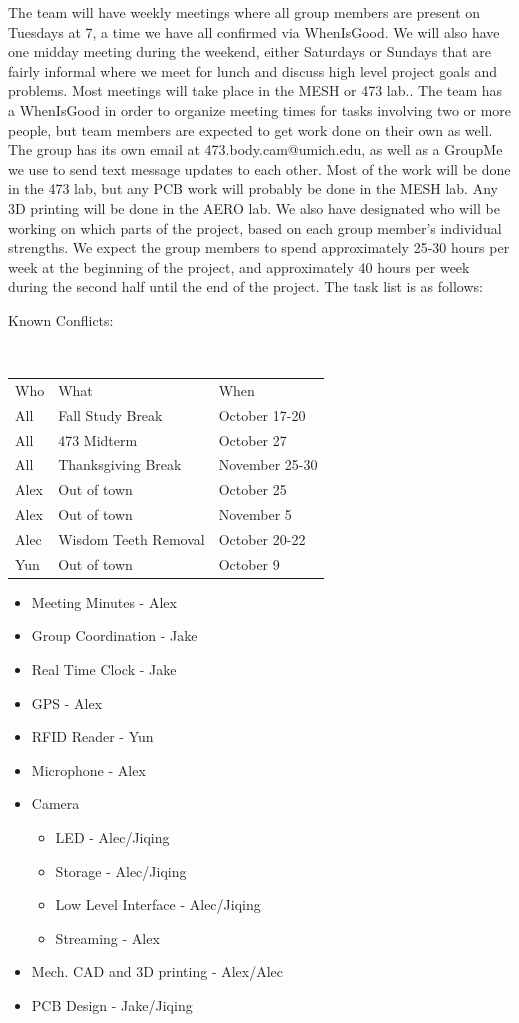 \documentclass[12pt]{article}
\begin{document}
The team will have weekly meetings where all group members are present on
Tuesdays at 7, a time we have all confirmed via WhenIsGood. We will also have
one midday meeting during the weekend, either Saturdays or Sundays that are
fairly informal where we meet for lunch and discuss high level project goals
and problems. Most meetings will take place in the MESH or 473 lab.. The team
has a WhenIsGood in order to organize meeting times for tasks involving two or
more people, but team members are expected to get work done on their own as
well. The group has its own email at 473.body.cam@umich.edu, as well as a
GroupMe we use to send text message updates to each other. Most of the work
will be done in the 473 lab, but any PCB work will probably be done in the MESH
lab. Any 3D printing will be done in the AERO lab. We also have designated who
will be working on which parts of the project, based on each group member’s
individual strengths. We expect the group members to spend approximately 25-30
hours per week at the beginning of the project, and approximately 40 hours per
week during the second half until the end of the project. The task list is as
follows:

Known Conflicts:

\ \\

\begin{tabular}{lll}
    Who & What & When\\
    All & Fall Study Break & October 17-20\\
    All & 473 Midterm & October 27\\
    All & Thanksgiving Break & November 25-30\\
    Alex & Out of town & October 25\\
    Alex & Out of town & November 5\\
    Alec & Wisdom Teeth Removal & October 20-22\\
    Yun & Out of town & October 9\\
\end{tabular}

\begin{itemize}
    \item Meeting Minutes - Alex
    \item Group Coordination - Jake
    \item Real Time Clock - Jake
    \item GPS - Alex
    \item RFID Reader - Yun
    \item Microphone - Alex
    \item Camera \begin{itemize}
            \item LED - Alec/Jiqing
            \item Storage - Alec/Jiqing
            \item Low Level Interface - Alec/Jiqing
            \item Streaming - Alex
        \end{itemize}
    \item Mech. CAD and 3D printing - Alex/Alec
    \item PCB Design - Jake/Jiqing
\end{itemize}
\end{document}
